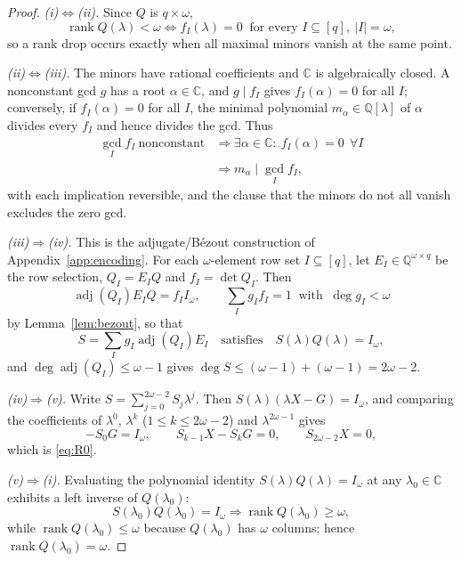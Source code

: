 \documentclass[journal]{IEEEtran}
\theoremstyle{plainn}
\theoremstyle{remark}
\begin{document}
\begin{proof}
\emph{(i)$\Leftrightarrow$(ii).} Since $Q$ is $q\times\omega$,
\begin{equation*}
\operatorname{rank}Q(\lambda)<\omega
\iff f_I(\lambda)=0\ \text{ for every } I\subseteq[q],\ |I|=\omega,
\end{equation*}
so a rank drop occurs exactly when all maximal minors vanish at the same point.

\emph{(ii)$\Leftrightarrow$(iii).} The minors have rational coefficients and
$\mathbb C$ is algebraically closed. A nonconstant gcd $g$ has a root
$\alpha\in\mathbb C$, and $g\mid f_I$ gives $f_I(\alpha)=0$ for all $I$;
conversely, if $f_I(\alpha)=0$ for all $I$, the minimal polynomial
$m_\alpha\in\mathbb Q[\lambda]$ of $\alpha$ divides every $f_I$ and hence
divides the gcd. Thus
\begin{equation*}
\begin{aligned}
\gcd_I f_I\ \text{nonconstant}
&\Longrightarrow\exists\alpha\in\mathbb C:\ f_I(\alpha)=0\ \ \forall I\\
&\Longrightarrow m_\alpha\mid\gcd_I f_I ,
\end{aligned}
\end{equation*}
with each implication reversible, and the clause that the minors do not all
vanish excludes the zero gcd.

\emph{(iii)$\Rightarrow$(iv).} This is the adjugate/B\'ezout construction of
Appendix~\ref{app:encoding}. For each $\omega$-element row set
$I\subseteq[q]$, let $E_I\in\mathbb Q^{\omega\times q}$ be the row selection,
$Q_I=E_IQ$ and $f_I=\det Q_I$. Then
\begin{equation*}
\operatorname{adj}(Q_I)E_IQ=f_II_\omega,\qquad
\sum_Ig_If_I=1\ \text{ with }\ \deg g_I<\omega
\end{equation*}
by Lemma~\ref{lem:bezout}, so that
\begin{equation*}
S=\sum_Ig_I\operatorname{adj}(Q_I)E_I
\quad\text{satisfies}\quad
S(\lambda)Q(\lambda)=I_\omega ,
\end{equation*}
and $\deg\operatorname{adj}(Q_I)\le\omega-1$ gives
$\deg S\le(\omega-1)+(\omega-1)=2\omega-2$.

\emph{(iv)$\Rightarrow$(v).} Write $S=\sum_{j=0}^{2\omega-2}S_j\lambda^j$. Then
$S(\lambda)(\lambda X-G)=I_\omega$, and comparing the coefficients of
$\lambda^0$, $\lambda^k$ ($1\le k\le2\omega-2$) and $\lambda^{2\omega-1}$ gives
\begin{equation*}
-S_0G=I_\omega,\qquad S_{k-1}X-S_kG=0,\qquad S_{2\omega-2}X=0,
\end{equation*}
which is \eqref{eq:R0}.

\emph{(v)$\Rightarrow$(i).} Evaluating the polynomial identity
$S(\lambda)Q(\lambda)=I_\omega$ at any $\lambda_0\in\mathbb C$ exhibits a left
inverse of $Q(\lambda_0)$:
\begin{equation*}
S(\lambda_0)Q(\lambda_0)=I_\omega
\Longrightarrow\operatorname{rank}Q(\lambda_0)\ge\omega,
\end{equation*}
while $\operatorname{rank}Q(\lambda_0)\le\omega$ because $Q(\lambda_0)$ has
$\omega$ columns; hence $\operatorname{rank}Q(\lambda_0)=\omega$.
\end{proof}
\end{document}
